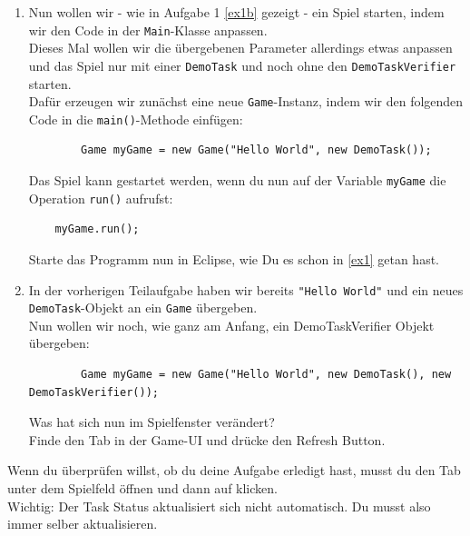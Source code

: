 
\label{ex3}

\begin{enumerate}
    \item Nun wollen wir - wie in Aufgabe 1 \ref{ex1b} gezeigt - ein Spiel starten, indem wir den Code in der \lstinline{Main}-Klasse anpassen.\\
    Dieses Mal wollen wir die übergebenen Parameter allerdings etwas anpassen und das Spiel nur mit einer \lstinline{DemoTask} und noch ohne den \lstinline{DemoTaskVerifier} starten.\\
	Dafür erzeugen wir zunächst eine neue \lstinline{Game}-Instanz, indem wir den folgenden Code in die \lstinline{main()}-Methode einfügen:

    \begin{lstlisting}
		Game myGame = new Game("Hello World", new DemoTask());
    \end{lstlisting}

    Das Spiel kann gestartet werden, wenn du nun auf der Variable \lstinline{myGame} die Operation \lstinline{run()} aufrufst:

    \begin{lstlisting}
	myGame.run();
    \end{lstlisting}

    Starte das Programm nun in Eclipse, wie Du es schon in \ref{ex1} getan hast.

    \vspace{5mm}

    \item In der vorherigen Teilaufgabe haben wir bereits \lstinline{"Hello World"} und ein neues \lstinline{DemoTask}-Objekt an ein \lstinline{Game} übergeben.\\
    Nun wollen wir noch, wie ganz am Anfang, ein DemoTaskVerifier Objekt übergeben:

    \begin{lstlisting}
		Game myGame = new Game("Hello World", new DemoTask(), new DemoTaskVerifier());
    \end{lstlisting}

        Was hat sich nun im Spielfenster verändert?\\
        Finde den  Tab in der Game-UI und drücke den Refresh Button.

\end{enumerate}


\begin{Infobox}
    Wenn du überprüfen willst, ob du deine Aufgabe erledigt hast, musst du den  Tab unter dem Spielfeld öffnen und dann auf  klicken.\\

    Wichtig: Der Task Status aktualisiert sich nicht automatisch. Du musst also immer selber aktualisieren.
\end{Infobox}



